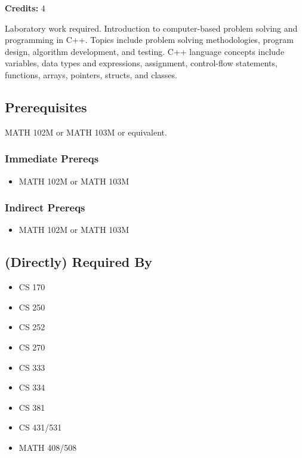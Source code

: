\documentclass[]{article}
\providecommand{\tightlist}{%
  \setlength{\itemsep}{0pt}\setlength{\parskip}{0pt}}
\begin{document}
\textbf{Credits:} 4

Laboratory work required. Introduction to computer-based problem solving
and programming in C++. Topics include problem solving methodologies,
program design, algorithm development, and testing. C++ language
concepts include variables, data types and expressions, assignment,
control-flow statements, functions, arrays, pointers, structs, and
classes.

\subsection{Prerequisites}\label{prerequisites-5}

MATH 102M or MATH 103M or equivalent.

\subsubsection{Immediate Prereqs}\label{immediate-prereqs-2}

\begin{itemize}
\tightlist
\item
  MATH 102M or MATH 103M
\end{itemize}

\subsubsection{Indirect Prereqs}\label{indirect-prereqs-2}

\begin{itemize}
\tightlist
\item
  MATH 102M or MATH 103M
\end{itemize}

\subsection{(Directly) Required By}\label{directly-required-by}

\begin{multicols}{2}
\begin{itemize}
\tightlist
\item
  CS 170
\item
  CS 250
\item
  CS 252
\item
  CS 270
\item
  CS 333
\item
  CS 334
\item
  CS 381
\item
  CS 431/531
\item
  MATH 408/508
\end{itemize}
\end{multicols}
\end{document}
